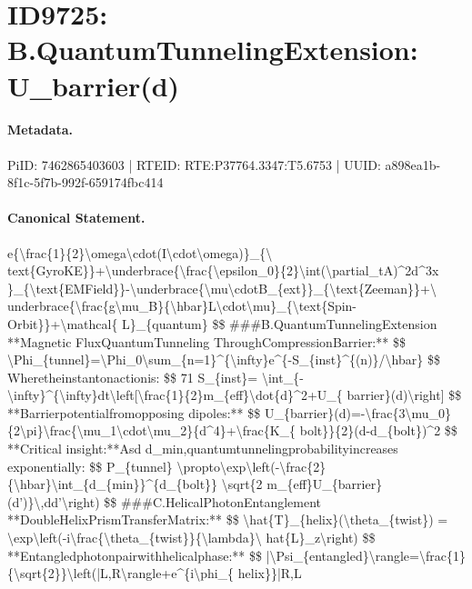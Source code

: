 \section*{ID9725: B.QuantumTunnelingExtension: U\_barrier(d)}
\paragraph{Metadata.}
PiID: 7462865403603 | RTEID: RTE:P37764.3347:T5.6753 | UUID: a898ea1b-8f1c-5f7b-992f-659174fbc414

\paragraph{Canonical Statement.}
e\{\textbackslash{}frac\{1\}\{2\}\textbackslash{}omega\textbackslash{}cdot(I\textbackslash{}cdot\textbackslash{}omega)\}\_\{\textbackslash{} text\{GyroKE\}\}+\textbackslash{}underbrace\{\textbackslash{}frac\{\textbackslash{}epsilon\_0\}\{2\}\textbackslash{}int(\textbackslash{}partial\_tA)\textasciicircum{}2d\textasciicircum{}3x \}\_\{\textbackslash{}text\{EMField\}\}-\textbackslash{}underbrace\{\textbackslash{}mu\textbackslash{}cdotB\_\{ext\}\}\_\{\textbackslash{}text\{Zeeman\}\}+\textbackslash{} underbrace\{\textbackslash{}frac\{g\textbackslash{}mu\_B\}\{\textbackslash{}hbar\}L\textbackslash{}cdot\textbackslash{}mu\}\_\{\textbackslash{}text\{Spin-Orbit\}\}+\textbackslash{}mathcal\{ L\}\_\{quantum\} \$\$ \#\#\#B.QuantumTunnelingExtension **Magnetic FluxQuantumTunneling ThroughCompressionBarrier:** \$\$ \textbackslash{}Phi\_\{tunnel\}=\textbackslash{}Phi\_0\textbackslash{}sum\_\{n=1\}\textasciicircum{}\{\textbackslash{}infty\}e\textasciicircum{}\{-S\_\{inst\}\textasciicircum{}\{(n)\}/\textbackslash{}hbar\} \$\$ Wheretheinstantonactionis: \$\$ 71 S\_\{inst\}= \textbackslash{}int\_\{-\textbackslash{}infty\}\textasciicircum{}\{\textbackslash{}infty\}dt\textbackslash{}left[\textbackslash{}frac\{1\}\{2\}m\_\{eff\}\textbackslash{}dot\{d\}\textasciicircum{}2+U\_\{ barrier\}(d)\textbackslash{}right] \$\$ **Barrierpotentialfromopposing dipoles:** \$\$ U\_\{barrier\}(d)=-\textbackslash{}frac\{3\textbackslash{}mu\_0\}\{2\textbackslash{}pi\}\textbackslash{}frac\{\textbackslash{}mu\_1\textbackslash{}cdot\textbackslash{}mu\_2\}\{d\textasciicircum{}4\}+\textbackslash{}frac\{K\_\{ bolt\}\}\{2\}(d-d\_\{bolt\})\textasciicircum{}2 \$\$ **Critical insight:**Asd d\_min,quantumtunnelingprobabilityincreases exponentially: \$\$ P\_\{tunnel\} \textbackslash{}propto\textbackslash{}exp\textbackslash{}left(-\textbackslash{}frac\{2\}\{\textbackslash{}hbar\}\textbackslash{}int\_\{d\_\{min\}\}\textasciicircum{}\{d\_\{bolt\}\} \textbackslash{}sqrt\{2 m\_\{eff\}U\_\{barrier\}(d’)\}\textbackslash{},dd’\textbackslash{}right) \$\$ \#\#\#C.HelicalPhotonEntanglement **DoubleHelixPrismTransferMatrix:** \$\$ \textbackslash{}hat\{T\}\_\{helix\}(\textbackslash{}theta\_\{twist\}) = \textbackslash{}exp\textbackslash{}left(-i\textbackslash{}frac\{\textbackslash{}theta\_\{twist\}\}\{\textbackslash{}lambda\}\textbackslash{} hat\{L\}\_z\textbackslash{}right) \$\$ **Entangledphotonpairwithhelicalphase:** \$\$ |\textbackslash{}Psi\_\{entangled\}\textbackslash{}rangle=\textbackslash{}frac\{1\}\{\textbackslash{}sqrt\{2\}\}\textbackslash{}left(|L,R\textbackslash{}rangle+e\textasciicircum{}\{i\textbackslash{}phi\_\{ helix\}\}|R,L

